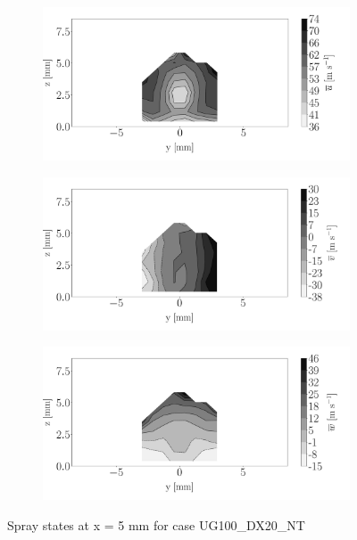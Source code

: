 \begin{figure}[h!]
\begin{subfigure}[b]{0.3\textwidth}
	\centering
   \includegraphics[scale=\scaleSLIJICF]{./part2_developments/figures_ch5_resolved_JICF/injectors_SLI/uG100_dx20_x05_NT_ux_mean_map}
\end{subfigure}
   \hspace{0.17in}
\begin{subfigure}[b]{0.3\textwidth}
	\centering
   \includegraphics[scale=\scaleSLIJICF]{./part2_developments/figures_ch5_resolved_JICF/injectors_SLI/uG100_dx20_x05_NT_uy_mean_map}
\end{subfigure}
   \hspace{0.17in}
\begin{subfigure}[b]{0.3\textwidth}
	\centering
   \includegraphics[scale=\scaleSLIJICF]{./part2_developments/figures_ch5_resolved_JICF/injectors_SLI/uG100_dx20_x05_NT_uz_mean_map}
\end{subfigure}
\caption{Spray states at x = 5 mm for case UG100\_DX20\_NT}
\label{fig:injectors_sli_uG100_dx20_x05_NT}
\end{figure}


